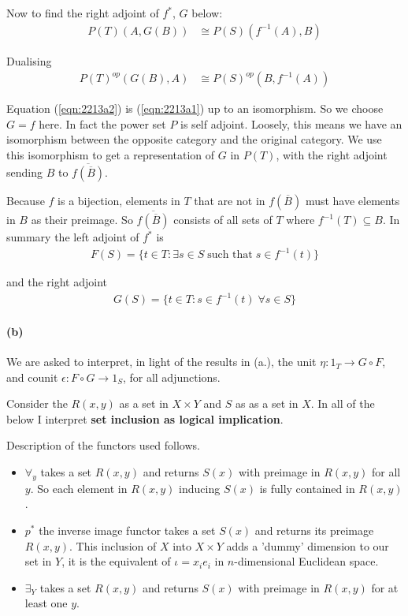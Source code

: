\documentclass{article}
\begin{document}
Now to find the right adjoint of $f^*$, $G$ below:
\begin{align*}
  P(T)(A,G(B)) & \cong P(S)(f^{-1}(A), B)
\end{align*}

Dualising
\begin{align}
\label{eqn:2213a2}
  P(T)^{op}(G(B),A) & \cong P(S)^{op}(B, f^{-1}(A))
\end{align}

Equation (\ref{eqn:2213a2}) is (\ref{eqn:2213a1}) up to an isomorphism. So we choose $G = f$ here. In fact the power set $P$ is self adjoint. Loosely, this means we have an isomorphism between the opposite category and the original category. We use this isomorphism to get a representation of $G$ in $P(T)$, with the right adjoint sending $B$ to $\overline{f(\overline{B})}$.

Because $f$ is a bijection, elements in $T$ that are not in $f(\overline{B})$ must have elements in $B$ as their preimage. So $\overline{f(\overline{B})}$ consists of all sets of $T$ where $f^{-1}(T) \subseteq B$. In summary the left adjoint of $f^*$ is
\begin{align*}
  F(S) = \{ t \in T: \exists s \in S \; \text{such that} \; s \in f^{-1}(t) \}
\end{align*}

and the right adjoint
\begin{align*}
  G(S) = \{ t \in T: s \in f^{-1}(t) \; \forall s \in S \}
\end{align*}

\paragraph{(b)}

We are asked to interpret, in light of the results in (a.), the unit $\eta\colon 1_T \rightarrow G \circ F$, and counit $\epsilon\colon F \circ G \rightarrow 1_S$, for all adjunctions.

Consider the $R(x, y)$ as a set in $X \times Y$ and $S$ as as a set in $X$. In all of the below I interpret \textbf{set inclusion as logical implication}.

Description of the functors used follows.

\begin {itemize}

\item $\forall_y$ takes a set $R(x,y)$ and returns $S(x)$ with preimage in $R(x,y)$ for all $y$. So each element in $R(x,y)$ inducing $S(x)$ is fully contained in $R(x,y)$.
\item $p^*$ the inverse image functor takes a set $S(x)$ and returns its preimage $R(x,y)$. This inclusion
  of $X$ into $X \times Y$ adds a 'dummy' dimension to our set in $Y$, it is the equivalent of $\iota=x_ie_i$ in $n$-dimensional Euclidean space.
\item $\exists_Y$ takes a set $R(x,y)$ and returns $S(x)$ with preimage in $R(x,y)$ for at least one $y$.
\end{itemize}
\end{document}
